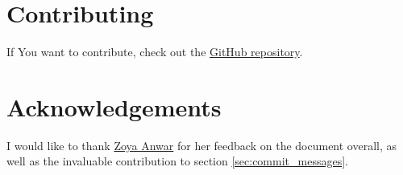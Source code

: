 \documentclass{article}
\begin{document}
\section{Contributing}
\label{sec:contributing}
If You want to contribute, check out the \href{https://github.com/marzipan14/git_tips}{GitHub repository}.

\section{Acknowledgements}
I would like to thank \href{https://www.linkedin.com/in/zoya-anwar/}{Zoya Anwar} for her feedback on the document overall, as well as the invaluable contribution to section \ref{sec:commit_messages}.
\end{document}

